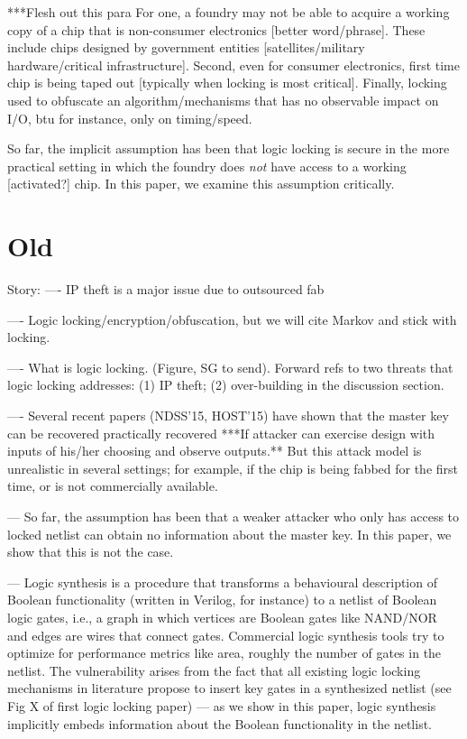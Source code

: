 ***Flesh out this para
For one, a foundry may not be able to 
acquire a working copy of a chip that is  
non-consumer electronics [better word/phrase]. 
These include chips designed by government entities [satellites/military 
hardware/critical infrastructure]. Second, even for consumer electronics, first time chip is being taped out [typically when locking is most critical]. 
Finally, locking used to obfuscate an algorithm/mechanisms that has no observable impact on I/O, btu for instance, only on timing/speed. 

So far, the implicit assumption has been that logic locking 
is secure in the more practical setting in which the 
foundry does \emph{not} have access to a working [activated?] chip. 
In this paper, we examine this assumption critically. 
  

 
   





 
 




\section{Old}
Story:
 ---- IP theft is a major issue due to outsourced fab
 
 ---- Logic locking/encryption/obfuscation, but we will cite Markov and stick with locking.
 
 ---- What is logic locking. (Figure, SG to send). Forward refs 
 to two threats that logic locking addresses: (1) IP theft; (2) over-building in the discussion section.
 
 ---- Several recent papers (NDSS'15, HOST'15) have shown that the master key can be recovered practically recovered ***If attacker can exercise design with inputs of his/her choosing and observe outputs.** But this attack model is unrealistic in several settings; for example, if the chip is being fabbed for the first time, or is not commercially available. 
 
 --- So far, the assumption has been that a weaker attacker who only has access to locked netlist can obtain no information about the master key. In this paper, we show that this is not the case. 
 
 
--- Logic synthesis is a procedure that transforms a behavioural description of Boolean functionality (written in Verilog, for instance) to a netlist of Boolean logic gates, i.e., a graph in which vertices are Boolean gates like NAND/NOR and edges are wires that connect gates. Commercial logic synthesis tools try to optimize for performance metrics like area, roughly the number of gates in the netlist. The vulnerability arises from the fact that all existing 
logic locking mechanisms in literature propose to insert key gates 
in a synthesized netlist (see Fig X of first logic locking paper) 
--- as we show in this paper, logic synthesis implicitly embeds information about the Boolean functionality in the netlist. 

